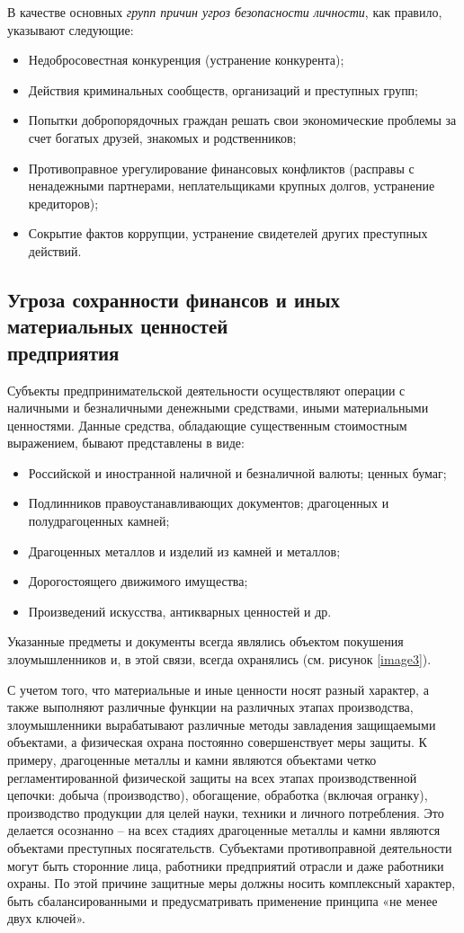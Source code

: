 \documentclass[a4paper,12pt,fleqn]{article} %
\begin{document}
В качестве основных \textit{групп причин угроз безопасности личности}, как правило, указывают следующие:
\begin{itemize}
	\item Недобросовестная конкуренция (устранение конкурента);
	\item Действия криминальных сообществ, организаций и преступных групп; 
	\item Попытки добропорядочных граждан решать свои экономические проблемы за счет богатых друзей, знакомых и родственников;
	\item Противоправное урегулирование финансовых конфликтов (расправы с ненадежными партнерами, неплательщиками крупных долгов, устранение кредиторов);
	\item Сокрытие фактов коррупции, устранение свидетелей других преступных действий.
\end{itemize}

\subsection{Угроза сохранности финансов и иных материальных ценностей \\предприятия}

Субъекты предпринимательской деятельности осуществляют операции с наличными и безналичными денежными средствами, иными материальными ценностями. Данные средства, обладающие существенным стоимостным выражением, бывают представлены в виде: 
\begin{itemize}
	\item Российской и иностранной наличной и безналичной валюты; ценных бумаг; 
	\item Подлинников правоустанавливающих документов; драгоценных и полудрагоценных камней;
	\item Драгоценных металлов и изделий из камней и металлов;
	\item Дорогостоящего движимого имущества; 
	\item Произведений искусства, антикварных ценностей и др. 
\end{itemize}
	
Указанные предметы и документы всегда являлись объектом покушения злоумышленников и, в этой связи, всегда охранялись (см. рисунок \ref{image3}).

С учетом того, что материальные и иные ценности носят разный характер, а также выполняют различные функции на различных этапах производства, злоумышленники вырабатывают различные методы завладения защищаемыми объектами, а физическая охрана постоянно совершенствует меры защиты. К примеру, драгоценные металлы и камни являются объектами четко регламентированной физической защиты на всех этапах производственной цепочки: добыча (производство), обогащение, обработка (включая огранку), производство продукции для целей науки, техники и личного потребления. Это делается осознанно – на всех стадиях драгоценные металлы и камни являются объектами преступных посягательств. Субъектами противоправной деятельности могут быть сторонние лица, работники предприятий отрасли и даже работники охраны. По этой причине защитные меры должны носить комплексный характер, быть сбалансированными и предусматривать применение принципа «не менее двух ключей».
\end{document}
